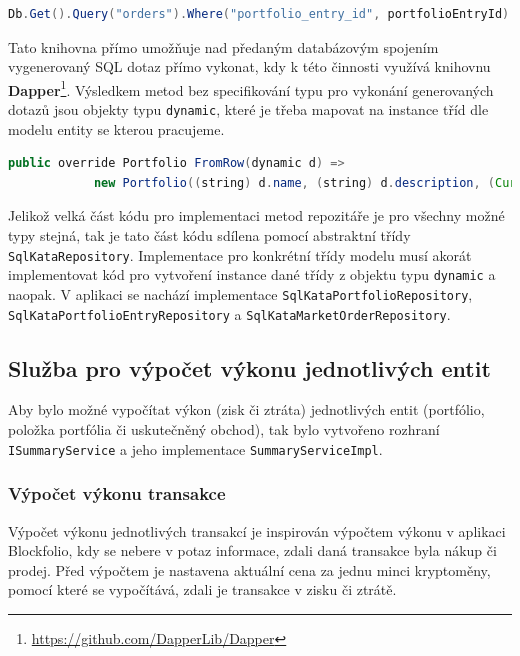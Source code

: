 \documentclass[12pt, a4paper]{article}
\begin{document}
    \begin{lstlisting}[language=Java, caption={Příklad generování SQL dotazu pro výběr všech transakcí dané položky portfólia pomocí knihovny SqlKata Query Builder.},captionpos=b, label={lst:sm-showcase}]
Db.Get().Query("orders").Where("portfolio_entry_id", portfolioEntryId).Get()
    \end{lstlisting}

    Tato knihovna přímo umožňuje nad předaným databázovým spojením vygenerovaný SQL dotaz přímo vykonat, kdy k této činnosti využívá knihovnu \textbf{Dapper}\footnote{\url{https://github.com/DapperLib/Dapper}}.
    Výsledkem metod bez specifikování typu pro vykonání generovaných dotazů jsou objekty typu \texttt{dynamic}, které je třeba mapovat na instance tříd dle modelu entity se kterou pracujeme.

    \begin{lstlisting}[language=Java,caption={Příklad mapování objektu typu \texttt{dynamic} na instanci třídy \texttt{Portfolio}.},captionpos=b, label={lst:sm-mapping}]
public override Portfolio FromRow(dynamic d) =>
            new Portfolio((string) d.name, (string) d.description, (Currency) d.currency_code, (int) d.id);
    \end{lstlisting}

    Jelikož velká část kódu pro implementaci metod repozitáře je pro všechny možné typy stejná, tak je tato část kódu sdílena pomocí abstraktní třídy \texttt{SqlKataRepository}. Implementace pro konkrétní třídy modelu musí akorát implementovat kód pro vytvoření instance dané třídy z objektu typu \texttt{dynamic} a naopak. V aplikaci se nachází implementace \texttt{SqlKataPortfolioRepository}, \texttt{SqlKataPortfolioEntryRepository} a \texttt{SqlKataMarketOrderRepository}.

    \subsection{Služba pro výpočet výkonu jednotlivých entit}
    Aby bylo možné vypočítat výkon (zisk či ztráta) jednotlivých entit (portfólio, položka portfólia či uskutečněný obchod), tak bylo vytvořeno rozhraní \texttt{ISummaryService} a jeho implementace \texttt{SummaryServiceImpl}.
    
    \subsubsection{Výpočet výkonu transakce}
    Výpočet výkonu jednotlivých transakcí je inspirován výpočtem výkonu v aplikaci Blockfolio, kdy se nebere v potaz informace, zdali daná transakce byla nákup či prodej.
    Před výpočtem je nastavena aktuální cena za jednu minci kryptoměny, pomocí které se vypočítává, zdali je transakce v zisku či ztrátě.
    
\end{document}
